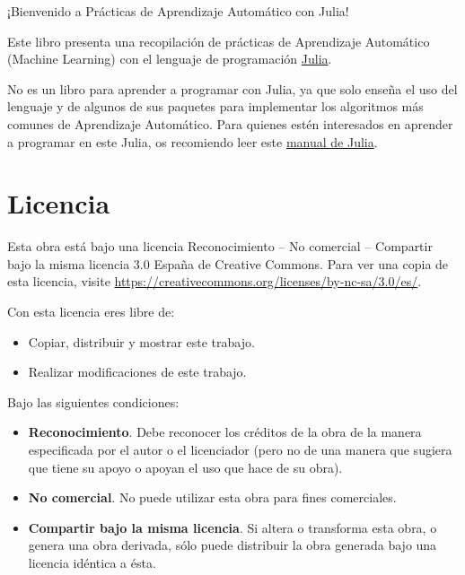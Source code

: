 \documentclass[
  a4paper,
]{scrreport}
\providecommand{\tightlist}{%
  \setlength{\itemsep}{0pt}\setlength{\parskip}{0pt}}\usepackage{longtable,booktabs,array}
\theoremstyle{definition}
\theoremstyle{remark}
\begin{document}

¡Bienvenido a Prácticas de Aprendizaje Automático con Julia!

Este libro presenta una recopilación de prácticas de Aprendizaje
Automático (Machine Learning) con el lenguaje de programación
\href{https://julialang.org/}{Julia}.

No es un libro para aprender a programar con Julia, ya que solo enseña
el uso del lenguaje y de algunos de sus paquetes para implementar los
algoritmos más comunes de Aprendizaje Automático. Para quienes estén
interesados en aprender a programar en este Julia, os recomiendo leer
este \href{https://aprendeconalf.es/manual-julia/}{manual de Julia}.

\section*{Licencia}\label{licencia}


Esta obra está bajo una licencia Reconocimiento -- No comercial --
Compartir bajo la misma licencia 3.0 España de Creative Commons. Para
ver una copia de esta licencia, visite
\url{https://creativecommons.org/licenses/by-nc-sa/3.0/es/}.

Con esta licencia eres libre de:

\begin{itemize}
\tightlist
\item
  Copiar, distribuir y mostrar este trabajo.
\item
  Realizar modificaciones de este trabajo.
\end{itemize}

Bajo las siguientes condiciones:

\begin{itemize}
\item
  \textbf{Reconocimiento}. Debe reconocer los créditos de la obra de la
  manera especificada por el autor o el licenciador (pero no de una
  manera que sugiera que tiene su apoyo o apoyan el uso que hace de su
  obra).
\item
  \textbf{No comercial}. No puede utilizar esta obra para fines
  comerciales.
\item
  \textbf{Compartir bajo la misma licencia}. Si altera o transforma esta
  obra, o genera una obra derivada, sólo puede distribuir la obra
  generada bajo una licencia idéntica a ésta.
\end{itemize}
\end{document}
